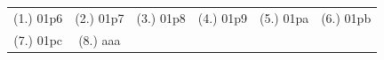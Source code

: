 \begin{eocexercises}{}
\begin{enumerate}
\end{enumerate}

\par \practiceinfo
\par \begin{tabular}[h]{cccccc}
(1.)	01p6	&
(2.)	01p7	&
(3.)	01p8	&
(4.)	01p9	&
(5.)	01pa	&
(6.)	01pb	\\ %
(7.)	01pc	&

(8.) aaa &
\end{tabular}

\end{eocexercises}










